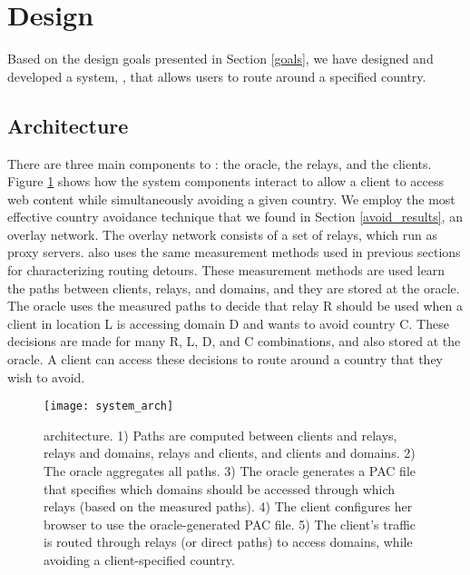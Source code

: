 \section{Design}
\label{system_design}
Based on the design goals presented in Section \ref{goals}, we have designed 
and developed a system, \system{}, that allows users to route around a specified 
country.

\subsection{Architecture}

There are three main components to \system{}: the oracle, the relays, and the 
clients.  Figure \ref{fig:arch} shows how the system components
interact to allow a client to access web content while simultaneously avoiding 
a given country.  We employ the most effective country avoidance technique that 
we found in Section \ref{avoid_results}, an overlay network.  The overlay network 
consists of a set of relays, which run as proxy servers.  \system{} also uses 
the same measurement methods used in previous sections for characterizing routing 
detours.  These measurement methods are used learn the paths between clients, 
relays, and domains, and they are stored at the oracle.  The oracle uses the 
measured paths to decide that relay R should be used when a client in location L 
is accessing domain D and wants to avoid country C.  These decisions are made 
for many R, L, D, and C combinations, and also stored at the oracle.  A 
client can access these decisions to route around a country that they wish 
to avoid.

\begin{figure}[t]
\centering
\texttt{[image: system\_arch]}
\caption{\system{} architecture. 1) Paths are computed between clients and relays, 
relays and domains, relays and clients, and clients and domains.  2) The oracle 
aggregates all paths.  3)  The oracle generates a PAC file that specifies which 
domains should be accessed through which relays (based on the measured paths).  
4) The client configures her browser to use the oracle-generated PAC file.  5) 
The client's traffic is routed through relays (or direct paths) to access domains, 
while avoiding a client-specified country.}
\label{fig:arch}
\end{figure}

